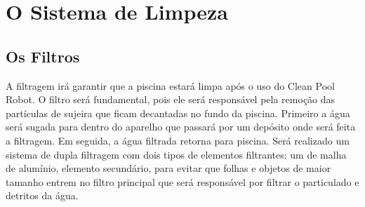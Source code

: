 \section{O Sistema de Limpeza}
\subsection{Os Filtros}
A filtragem irá garantir que a piscina estará limpa após o uso do Clean Pool Robot. O filtro será fundamental, pois ele será responsável pela remoção das partículas de sujeira que ficam decantadas no fundo da piscina. Primeiro a água será sugada para dentro do aparelho que passará por um depósito onde será feita a filtragem. Em seguida, a água filtrada retorna para piscina. Será realizado um sistema de dupla filtragem com dois tipos de elementos filtrantes: um de malha de alumínio, elemento secundário, para evitar que folhas e objetos de maior tamanho entrem no filtro principal que será responsável por filtrar o particulado e detritos da água.

